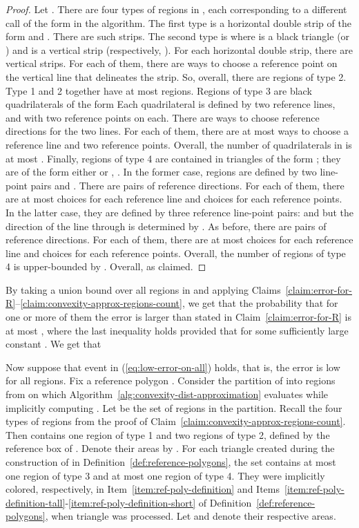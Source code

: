 \documentclass[11pt,english]{article}
\numberwithin{figure}{section}
\begin{document}
\begin{proof}
Let . There are four types of regions in , each corresponding to a different call of the form  in the algorithm. The first type is a horizontal double strip of the form  and . There are  such strips.
The second type is where  is a black triangle  (or ) and  is a vertical strip  (respectively, ). For each horizontal double strip, there are  vertical strips. For each of them, there are  ways to choose a reference point on the vertical line that delineates the strip. So, overall, there are  regions of type 2. Type 1 and 2 together have at most  regions.
Regions of type 3 are black quadrilaterals of the form  Each quadrilateral is defined by two reference lines,  and  with two reference points on each. There are  ways to choose reference directions for the two lines. For each of them, there are at most  ways to choose a reference line and two reference points. Overall, the number of quadrilaterals in  is at most .
Finally, regions of type 4 are contained in triangles of the form ; they are of the form either  or , . In the former case, regions are defined by two line-point pairs  and . There are  pairs of reference directions. For each of them, there are at most  choices for each reference line and  choices for each reference points. In the latter case, they are defined by three reference line-point pairs:  and  but the direction of the line through  is determined by . As before, there are  pairs of reference directions. For each of them, there are at most  choices for each reference line and  choices for each reference points. Overall, the number of regions of type 4 is upper-bounded by .
Overall,  as claimed.
\end{proof}



By taking a union bound over all regions in  and applying Claims~\ref{claim:error-for-R}--\ref{claim:convexity-approx-regions-count}, we get that the probability that for one or more of them the error is larger than stated in Claim~\ref{claim:error-for-R} is at most ,
where the last inequality holds provided that  for some sufficiently large constant . We get that



Now suppose that event in (\ref{eq:low-error-on-all}) holds, that is, the error is low for all regions. Fix a reference polygon . Consider the partition of  into regions from  on which Algorithm~\ref{alg:convexity-dist-approximation} evaluates  while implicitly computing . Let  be the set of regions in the partition. Recall the four types of regions from the proof of Claim~\ref{claim:convexity-approx-regions-count}. Then   contains one region of type 1 and two regions of type 2, defined by the reference box of . Denote their areas by . For each triangle  created during the construction of  in Definition~\ref{def:reference-polygons}, the set  contains at most one region of type 3 and at most one region of type 4. They were implicitly colored, respectively, in Item~\ref{item:ref-poly-definition} and Items~\ref{item:ref-poly-definition-tall}-\ref{item:ref-poly-definition-short} of Definition~\ref{def:reference-polygons}, when triangle  was processed. Let  and  denote their respective areas.
\end{document}
